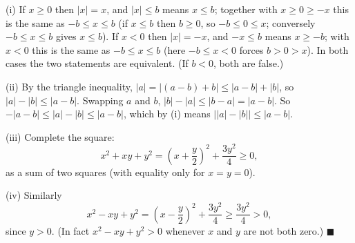 (i) If $x\ge0$ then $|x|=x$, and $|x|\le b$ means $x\le b$; together with $x\ge0\ge-x$ this is the same as $-b\le x\le b$ (if $x\le b$ then $b\ge0$, so $-b\le0\le x$; conversely $-b\le x\le b$ gives $x\le b$). If $x<0$ then $|x|=-x$, and $-x\le b$ means $x\ge-b$; with $x<0$ this is the same as $-b\le x\le b$ (here $-b\le x<0$ forces $b>0>x$). In both cases the two statements are equivalent. (If $b<0$, both are false.)

(ii) By the triangle inequality, $|a|=|(a-b)+b|\le|a-b|+|b|$, so $|a|-|b|\le|a-b|$. Swapping $a$ and $b$, $|b|-|a|\le|b-a|=|a-b|$. So $-|a-b|\le|a|-|b|\le|a-b|$, which by (i) means $\big||a|-|b|\big|\le|a-b|$.

(iii) Complete the square:
\[
x^2+xy+y^2=\left(x+\dfrac {y}{2}\right)^2+\dfrac{3y^2}{4}\ge0 ,
\]
as a sum of two squares (with equality only for $x=y=0$).

(iv) Similarly
\[
x^2-xy+y^2=\left(x-\dfrac {y}{2}\right)^2+\dfrac{3y^2}{4}\ge\dfrac{3y^2}{4}>0 ,
\]
since $y>0$. (In fact $x^2-xy+y^2>0$ whenever $x$ and $y$ are not both zero.) $\blacksquare$
